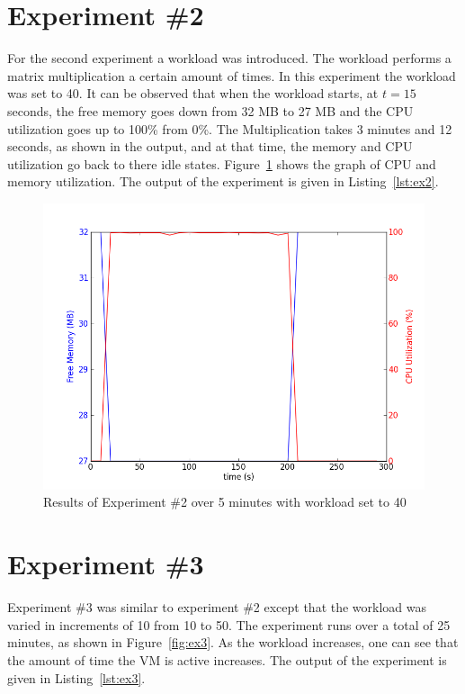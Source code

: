 \documentclass{article}
\begin{document}
  

\section{Experiment \#2}
  For the second experiment a workload was introduced. The workload
  performs a matrix multiplication a certain amount of times. In this
  experiment the workload was set to 40. It can be observed that when
  the workload starts, at $t=15$ seconds, the free memory goes down from
  32 MB to 27 MB and the CPU utilization goes up to 100\% from 0\%. The
  Multiplication takes 3 minutes and 12 seconds, as shown in the output,
  and at that time, the memory and CPU utilization go back to there idle
  states.  Figure~\ref{fig:ex2} shows the graph of CPU and memory
  utilization. The output of the experiment is given in
  Listing~\ref{lst:ex2}.

  \begin{figure}
    \begin{center}
      \includegraphics[scale=0.50]{ex2.png} 
      \caption{Results of Experiment \#2 over 5 minutes with workload
      set to 40}
      \label{fig:ex2}
    \end{center}
  \end{figure}

  

\section{Experiment \#3}
  Experiment \#3 was similar to experiment \#2 except that the workload
  was varied in increments of 10 from 10 to 50. The experiment runs over
  a total of 25 minutes, as shown in Figure~\ref{fig:ex3}. As the
  workload increases, one can see that the amount of time the VM is
  active increases.  The output of the experiment is given in
  Listing~\ref{lst:ex3}.
\end{document}
